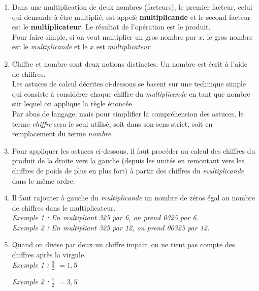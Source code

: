 \documentclass[a4paper, twoside]{article}
\begin{document}
			\begin{enumerate}

				\item Dans une multiplication de deux nombres (facteurs), 
				le premier facteur, celui qui demande à être multiplié, 
				est appelé \textbf{multiplicande} et le second facteur 
				est le \textbf{multiplicateur}. Le résultat de l'opération est le produit.\\
				Pour faire simple, si on veut multiplier un gros nombre par $x$, 
				le gros nombre est le \textit{multiplicande} et le $x$ est \textit{multiplicateur}.\\

				\item Chiffre et nombre sont deux notions distinctes. 
				Un nombre est écrit à l'aide de chiffres.\\
				Les astuces de calcul décrites ci-dessous 
				se basent sur une technique simple qui consiste 
				à considérer chaque chiffre du \textit{multiplicande} 
				en tant que nombre sur lequel on applique la règle énoncée.\\
				Par abus de langage, 
				mais pour simplifier la compréhension des astuces, 
				le terme \textit{chiffre} sera le seul utilisé, 
				soit dans son sens strict, 
				soit en remplacement du terme \textit{nombre}.\\

				\item Pour appliquer les astuces ci-dessous, 
				il faut procéder au calcul des chiffres du produit
				de la droite vers la gauche (depuis les unités en remontant 
				vers les chiffres de poids de plus en plus fort) 
				à partir des chiffres du \textit{multiplicande} dans le même ordre.\\

				\item Il faut rajouter à gauche du \textit{multiplicande} 
				un nombre de zéros égal au nombre de chiffres dans le multiplicateur.\\
				\textit{Exemple 1 : En multipliant 325 par 6, on prend 0325 par 6.}\\
				\textit{Exemple 2 : En multipliant 325 par 12, on prend 00325 par 12.}\\

				\item Quand on divise par deux un chiffre impair, 
				on ne tient pas compte des chiffres après la virgule.\\
				
				\textit{Exemple 1 : {\Large $\frac{3}{2}$} $= 1$\sout{$,5$}}

				\textit{Exemple 2 : {\Large $\frac{7}{2}$} $= 3$\sout{$,5$}}

			\end{enumerate}
\end{document}

